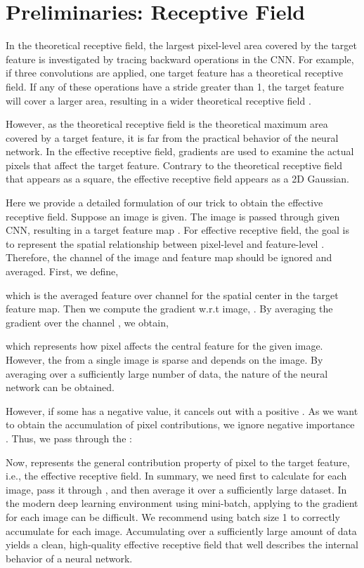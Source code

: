 \documentclass[letterpaper]{article} \usepackage{aaai22}  \usepackage{times}  \usepackage{helvet}  \usepackage{courier}  \usepackage[hyphens]{url}  \usepackage{graphicx} \urlstyle{rm} \def\UrlFont{\rm}  \usepackage{natbib}  \usepackage{caption} \DeclareCaptionStyle{ruled}{labelfont=normalfont,labelsep=colon,strut=off} \frenchspacing  \setlength{\pdfpagewidth}{8.5in}  \setlength{\pdfpageheight}{11in}  \usepackage{algorithm}
\begin{document}
\section{Preliminaries: Receptive Field}
\label{sec:Background_Receptive_Field}

In the theoretical receptive field, the largest pixel-level area covered by the target feature is investigated by tracing backward operations in the CNN. For example, if three  convolutions are applied, one target feature has a  theoretical receptive field. If any of these operations have a stride greater than 1, the target feature will cover a larger area, resulting in a wider theoretical receptive field \cite{araujo2019computing}.

However, as the theoretical receptive field is the theoretical maximum area covered by a target feature, it is far from the practical behavior of the neural network. In the effective receptive field, gradients are used to examine the actual pixels that affect the target feature. Contrary to the theoretical receptive field that appears as a square, the effective receptive field appears as a 2D Gaussian.

Here we provide a detailed formulation of our trick to obtain the effective receptive field. Suppose an image  is given. The image is passed through given CNN, resulting in a target feature map . For effective receptive field, the goal is to represent the spatial relationship between pixel-level  and feature-level . Therefore, the channel of the image and feature map should be ignored and averaged. First, we define,

which is the averaged feature over channel  for the spatial center  in the target feature map. Then we compute the gradient w.r.t image, . By averaging the gradient over the channel , we obtain,

which represents how pixel  affects the central feature for the given image. However, the  from a single image is sparse and depends on the image. By averaging  over a sufficiently large number of data, the nature of the neural network can be obtained.

However, if some  has a negative value, it cancels out with a positive . As we want to obtain the accumulation of pixel contributions, we ignore negative importance \cite{selvaraju2017grad,chattopadhay2018grad}. Thus, we pass  through the  \cite{glorot2011deep}:


Now,  represents the general contribution property of pixel  to the target feature, i.e., the effective receptive field. In summary, we need first to calculate  for each image, pass it through , and then average it over a sufficiently large dataset. In the modern deep learning environment using mini-batch, applying  to the gradient for each image can be difficult. We recommend using batch size 1 to correctly accumulate  for each image. Accumulating  over a sufficiently large amount of data yields a clean, high-quality effective receptive field  that well describes the internal behavior of a neural network.
\end{document}
